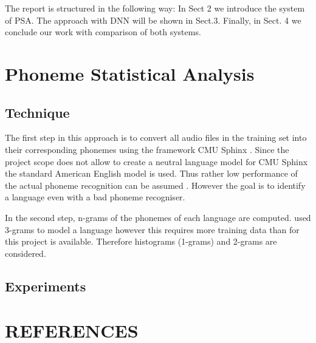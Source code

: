 \documentclass{article}
\begin{document}
The report is structured in the following way: In Sect 2 we introduce the system of PSA. The approach with DNN will be shown in Sect.3. Finally, in Sect. 4 we conclude our work with comparison of both systems. 

\section{Phoneme Statistical Analysis}
\subsection{Technique}
The first step in this approach is to convert all audio files in the training set into their corresponding phonemes using the framework CMU Sphinx \cite{lamere2003cmu}. Since the project scope does not allow to create a neutral language model for CMU Sphinx the standard American English model is used. Thus rather low performance of the actual phoneme recognition can be assumed \cite{kepuska2017comparing}. However the goal is to identify a language even with a bad phoneme recogniser.

In the second step, n-grams of the phonemes of each language are computed. \cite{matejka2005phonotactic} used 3-grams to model a language however this requires more training data than for this project is available. Therefore histograms (1-grams) and 2-grams are considered.

\subsection{Experiments}




\vfill\pagebreak

\section{REFERENCES}
\label{sec:refs}




\end{document}
